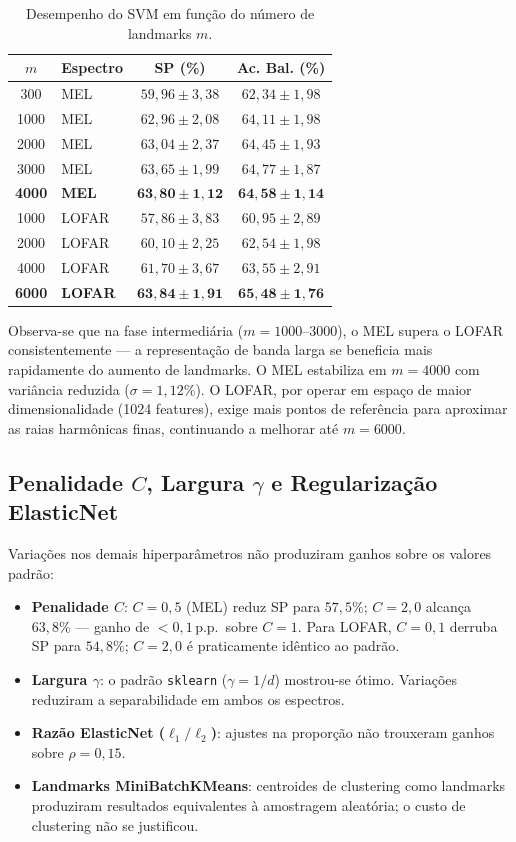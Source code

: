 \documentclass[a4paper,12pt]{article}
\begin{document}
\begin{table}[ht]
\centering
\caption{Desempenho do SVM em função do número de landmarks $m$.}
\label{tab:m_sweep}
\begin{tabular}{clcc}
\toprule
$m$ & Espectro & SP (\%) & Ac. Bal. (\%) \\
\midrule
300   & MEL   & $59{,}96 \pm 3{,}38$ & $62{,}34 \pm 1{,}98$ \\
1000  & MEL   & $62{,}96 \pm 2{,}08$ & $64{,}11 \pm 1{,}98$ \\
2000  & MEL   & $63{,}04 \pm 2{,}37$ & $64{,}45 \pm 1{,}93$ \\
3000  & MEL   & $63{,}65 \pm 1{,}99$ & $64{,}77 \pm 1{,}87$ \\
\textbf{4000} & \textbf{MEL} & $\mathbf{63{,}80 \pm 1{,}12}$ & $\mathbf{64{,}58 \pm 1{,}14}$ \\
\midrule
1000  & LOFAR & $57{,}86 \pm 3{,}83$ & $60{,}95 \pm 2{,}89$ \\
2000  & LOFAR & $60{,}10 \pm 2{,}25$ & $62{,}54 \pm 1{,}98$ \\
4000  & LOFAR & $61{,}70 \pm 3{,}67$ & $63{,}55 \pm 2{,}91$ \\
\textbf{6000} & \textbf{LOFAR} & $\mathbf{63{,}84 \pm 1{,}91}$ & $\mathbf{65{,}48 \pm 1{,}76}$ \\
\bottomrule
\end{tabular}
\end{table}

Observa-se que na fase intermediária ($m = 1000$--$3000$), o MEL supera o LOFAR consistentemente — a representação de banda larga se beneficia mais rapidamente do aumento de landmarks. O MEL estabiliza em $m=4000$ com variância reduzida ($\sigma = 1{,}12\%$). O LOFAR, por operar em espaço de maior dimensionalidade (1024 features), exige mais pontos de referência para aproximar as raias harmônicas finas, continuando a melhorar até $m=6000$.

\subsection{Penalidade $C$, Largura $\gamma$ e Regularização ElasticNet}

Variações nos demais hiperparâmetros não produziram ganhos sobre os valores padrão:

\begin{itemize}
    \item \textbf{Penalidade $C$}: $C=0{,}5$ (MEL) reduz SP para $57{,}5\%$; $C=2{,}0$ alcança $63{,}8\%$ — ganho de $< 0{,}1$\,p.p.\ sobre $C=1$. Para LOFAR, $C=0{,}1$ derruba SP para $54{,}8\%$; $C=2{,}0$ é praticamente idêntico ao padrão.
    \item \textbf{Largura $\gamma$}: o padrão \texttt{sklearn} ($\gamma = 1/d$) mostrou-se ótimo. Variações reduziram a separabilidade em ambos os espectros.
    \item \textbf{Razão ElasticNet ($\ell_1/\ell_2$)}: ajustes na proporção não trouxeram ganhos sobre $\rho = 0{,}15$.
    \item \textbf{Landmarks MiniBatchKMeans}: centroides de clustering como landmarks produziram resultados equivalentes à amostragem aleatória; o custo de clustering não se justificou.
\end{itemize}
\end{document}
